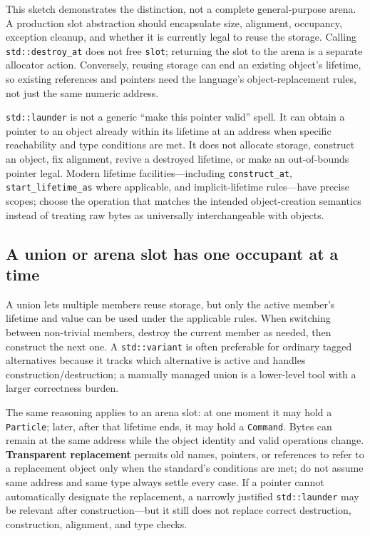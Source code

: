 This sketch demonstrates the distinction, not a complete general-purpose arena. A production slot abstraction should encapsulate size, alignment, occupancy, exception cleanup, and whether it is currently legal to reuse the storage. Calling \texttt{std::destroy\_at} does not free \texttt{slot}; returning the slot to the arena is a separate allocator action. Conversely, reusing storage can end an existing object's lifetime, so existing references and pointers need the language's object-replacement rules, not just the same numeric address.

\texttt{std::launder} is not a generic ``make this pointer valid'' spell. It can obtain a pointer to an object already within its lifetime at an address when specific reachability and type conditions are met. It does not allocate storage, construct an object, fix alignment, revive a destroyed lifetime, or make an out-of-bounds pointer legal. Modern lifetime facilities---including \texttt{construct\_at}, \texttt{start\_lifetime\_as} where applicable, and implicit-lifetime rules---have precise scopes; choose the operation that matches the intended object-creation semantics instead of treating raw bytes as universally interchangeable with objects.

\subsection{A union or arena slot has one occupant at a time}\label{05-engine-i-ch004-a-union-or-arena-slot-has-one-occupant-at-a-time}

A union lets multiple members reuse storage, but only the active member's lifetime and value can be used under the applicable rules. When switching between non-trivial members, destroy the current member as needed, then construct the next one. A \texttt{std::variant} is often preferable for ordinary tagged alternatives because it tracks which alternative is active and handles construction/destruction; a manually managed union is a lower-level tool with a larger correctness burden.

The same reasoning applies to an arena slot: at one moment it may hold a \texttt{Particle}; later, after that lifetime ends, it may hold a \texttt{Command}. Bytes can remain at the same address while the object identity and valid operations change. \textbf{Transparent replacement} permits old names, pointers, or references to refer to a replacement object only when the standard's conditions are met; do not assume same address and same type always settle every case. If a pointer cannot automatically designate the replacement, a narrowly justified \texttt{std::launder} may be relevant after construction---but it still does not replace correct destruction, construction, alignment, and type checks.

